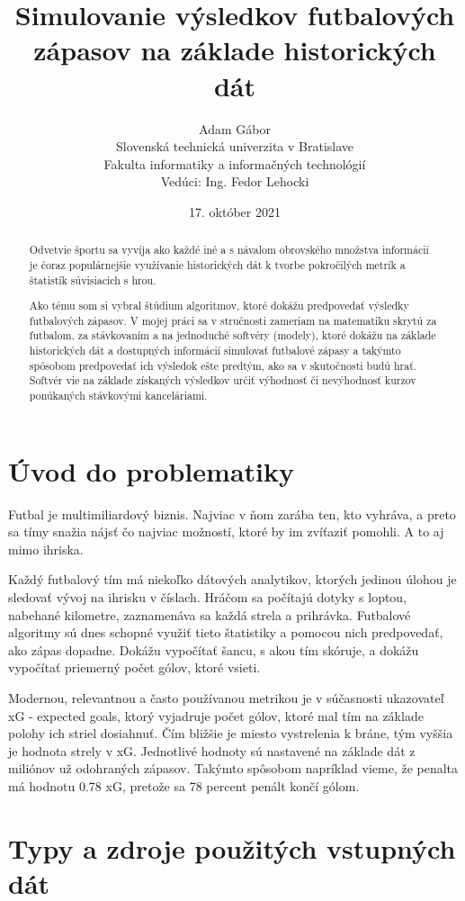 \documentclass[10pt,twoside,slovak,a4paper]{article}
\title{Simulovanie výsledkov futbalových zápasov na základe historických dát}
\author{Adam Gábor\\[2pt]
	{\small Slovenská technická univerzita v Bratislave}\\
	{\small Fakulta informatiky a informačných technológií}\\
	{\small Vedúci: Ing. Fedor Lehocki}\\
	}
\date{\small 17. október 2021}
\begin{document}
\maketitle

\begin{abstract}
Odvetvie športu sa vyvíja ako každé iné a s návalom obrovského množstva informácií je čoraz populárnejšie využívanie historických dát k tvorbe pokročilých metrík a štatistík súvisiacich s hrou.

Ako tému som si vybral štúdium algoritmov, ktoré dokážu predpovedať výsledky futbalových zápasov. V mojej práci sa v stručnosti zameriam na matematiku skrytú za futbalom, za stávkovaním a na jednoduché softvéry (modely), ktoré dokážu na základe historických dát a dostupných informácií simulovať futbalové zápasy a takýmto spôsobom predpovedať ich výsledok ešte predtým, ako sa v skutočnosti budú hrať. Softvér vie na základe získaných výsledkov určiť výhodnosť či nevýhodnosť kurzov ponúkaných stávkovými kanceláriami.

\end{abstract}

\section{Úvod do problematiky}

Futbal je multimiliardový biznis. Najviac v ňom zarába ten, kto vyhráva, a preto sa tímy snažia nájsť čo najviac možností, ktoré by im zvíťaziť pomohli. A to aj mimo ihriska.

Každý futbalový tím má niekoľko dátových analytikov, ktorých jedinou úlohou je sledovať vývoj na ihrisku v číslach. Hráčom sa počítajú dotyky s loptou, nabehané kilometre, zaznamenáva sa každá strela a prihrávka. Futbalové algoritmy sú dnes schopné využiť tieto štatistiky a pomocou nich predpovedať, ako zápas dopadne. Dokážu vypočítať šancu, s akou tím skóruje, a dokážu vypočítať priemerný počet gólov, ktoré vsieti.

Modernou, relevantnou a často používanou metrikou je v súčasnosti ukazovateľ xG - expected goals, ktorý vyjadruje počet gólov, ktoré mal tím na základe polohy ich striel dosiahnuť. Čím bližšie je miesto vystrelenia k bráne, tým vyššia je hodnota strely v xG. Jednotlivé hodnoty sú nastavené na základe dát z miliónov už odohraných zápasov. Takýmto spôsobom napríklad vieme, že penalta má hodnotu 0.78 xG, pretože sa 78 percent penált končí gólom.

\section{Typy a zdroje použitých vstupných dát}
\end{document}
